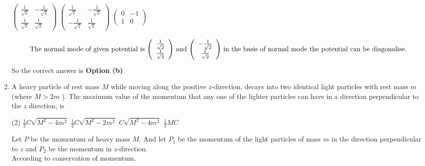 \begin{enumerate}
\begin{tasks}
	\task[\textbf{b.}]$\left(\begin{array}{cc}\frac{1}{\sqrt{2}} & -\frac{1}{\sqrt{2}} \\ \frac{1}{\sqrt{2}} & \frac{1}{\sqrt{2}}\end{array}\right)$
	\task[\textbf{c.}]$\left(\begin{array}{cc}\frac{1}{\sqrt{2}} & -\frac{1}{\sqrt{2}} \\ -\frac{1}{\sqrt{2}} & \frac{1}{\sqrt{2}}\end{array}\right)$
	\task[\textbf{d.}] $\left(\begin{array}{cc}0 & -1 \\ 1 & 0\end{array}\right)$
\end{tasks}
\begin{answer}
	\begin{align*}
\intertext{ The normal mode of given potential is $\left(\begin{array}{c}\frac{1}{\sqrt{2}} \\ \frac{1}{\sqrt{2}}\end{array}\right)$ and $\left(\begin{array}{c}-\frac{1}{\sqrt{2}} \\ \frac{1}{\sqrt{2}}\end{array}\right)$ in the basis of normal mode the potential can be diagonalise.}
	\end{align*}
	So the correct answer is \textbf{Option (b)}
\end{answer}
\item  A heavy particle of rest mass $M$ while moving along the positive $z$-direction, decays into two identical light particles with rest mass $m$ (where $M>2 m$ ). The maximum value of the momentum that any one of the lighter particles can have in a direction perpendicular to the $z$ direction, is
 \begin{tasks}(2)
	\task[\textbf{a.}] $\frac{1}{2} C \sqrt{M^{2}-4 m^{2}}$
	\task[\textbf{b.}]$\frac{1}{2} C \sqrt{M^{2}-2 m^{2}}$
	\task[\textbf{c.}] $C \sqrt{M^{2}-4 m^{2}}$
	\task[\textbf{d.}]$\frac{1}{2} M C$ 
\end{tasks}
\begin{answer}
	Let $P$ be the momentum of heavy mass $M$. And let $P_{1}$ be the momentum of the light particles of mass $m$ in the direction perpendicular to $z$ and $P_{2}$ be the momentum in $z$-direction.\\
	According to conservation of momentum,
	\begin{align*}

\end{align*}
\end{answer}
\end{enumerate}
